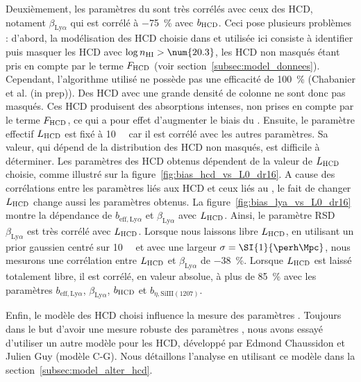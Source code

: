Deuxièmement, les paramètres du \lya{} sont très corrélés avec ceux des HCD, notament $\beta_{\mathrm{Ly}\alpha}$ qui est corrélé à \SI{-75}{\percent} avec $b_{\textsc{HCD}}$. Ceci pose plusieurs problèmes : d'abord, la modélisation des HCD choisie dans \textcite{DuMasdesBourboux2020} et utilisée ici consiste à identifier puis masquer les HCD avec $\log n_{\textsc{HI}} > \num{20.3}$, les HCD non masqués étant pris en compte par le terme $F_{\textsc{HCD}}$ (voir section~\ref{subsec:model_donnees}). Cependant, l'algorithme utilisé ne possède pas une efficacité de \SI{100}{\percent} (Chabanier et al. (in prep)). Des HCD avec une grande densité de colonne ne sont donc pas masqués.
Ces HCD produisent des absorptions intenses, non prises en compte par le terme $F_{\textsc{HCD}}$, ce qui a pour effet d'augmenter le biais du \lya{}.
Ensuite, le paramètre effectif $L_{\textsc{HCD}}$ est fixé à \SI{10}{\perh\Mpc} car il est corrélé avec les autres paramètres.
Sa valeur, qui dépend de la distribution des HCD non masqués, est difficile à déterminer.
Les paramètres des HCD obtenus dépendent de la valeur de $L_{\textsc{HCD}}$ choisie, comme illustré sur la figure~\ref{fig:bias_hcd_vs_L0_dr16}.
A cause des corrélations entre les paramètres liés aux HCD et ceux liés au \lya{}, le fait de changer $L_{\textsc{HCD}}$ change aussi les paramètres \lya{} obtenus.
La figure~\ref{fig:bias_lya_vs_L0_dr16} montre la dépendance de $b_{\mathrm{eff},\mathrm{Ly}\alpha}$ et $\beta_{\mathrm{Ly}\alpha}$ avec $L_{\textsc{HCD}}$. Ainsi, le paramètre RSD $\beta_{\mathrm{Ly}\alpha}$ est très corrélé avec $L_{\textsc{HCD}}$. Lorsque nous laissons libre $L_{\textsc{HCD}}$, en utilisant un prior gaussien centré sur \SI{10}{\perh\Mpc} et avec une largeur $\sigma = \SI{1}{\perh\Mpc}$, nous mesurons une corrélation entre $L_{\textsc{HCD}}$ et $\beta_{\mathrm{Ly}\alpha}$ de \SI{-38}{\percent}. Lorsque $L_{\textsc{HCD}}$ est laissé totalement libre, il est corrélé, en valeur absolue, à plus de \SI{85}{\percent} avec les paramètres $b_{\mathrm{eff},\mathrm{Ly}\alpha}$, $\beta_{\mathrm{Ly}\alpha}$, $b_{\textsc{HCD}}$ et $b_{\eta, \mathrm{SiIII}(1207)}$.

Enfin, le modèle des HCD choisi influence la mesure des paramètres \lya{}. Toujours dans le but d'avoir une mesure robuste des paramètres \lya{}, nous avons essayé d'utiliser un autre modèle pour les HCD, développé par Edmond Chaussidon et Julien Guy (modèle C-G). Nous détaillons l'analyse en utilisant ce modèle dans la section~\ref{subsec:model_alter_hcd}.

